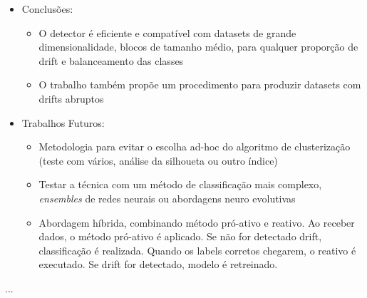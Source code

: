 \documentclass[qual, classic, a4paper]{ufbathesis}
\begin{document}
\begin{itemize}
    \item Conclusões:
    \begin{itemize}
        \item O detector é eficiente e compatível com datasets de grande dimensionalidade, blocos de tamanho médio, para qualquer proporção de drift e balanceamento das classes
        \item O trabalho também propõe um procedimento para produzir datasets com drifts abruptos
    \end{itemize}

    \item Trabalhos Futuros:
    \begin{itemize}
        \item Metodologia para evitar o escolha ad-hoc do algoritmo de clusterização (teste com vários, análise da silhoueta ou outro índice)
        \item Testar a técnica com um método de classificação mais complexo, \textit{ensembles} de redes neurais ou abordagens neuro evolutivas
        \item Abordagem híbrida, combinando método pró-ativo e reativo. Ao receber dados, o método pró-ativo é aplicado. Se não for detectado drift, classificação é realizada. Quando os labels corretos chegarem, o reativo é executado. Se drift for detectado, modelo é retreinado.
    \end{itemize}

\end{itemize}


...

\backmatter




\end{document}
